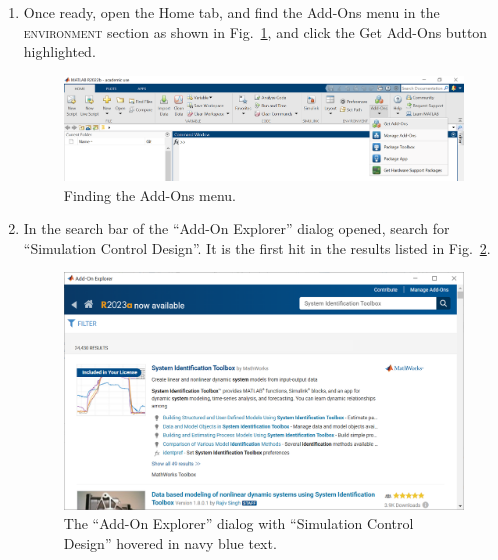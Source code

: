 \documentclass[12pt]{article}
\begin{document}
\begin{enumerate}
    \item
        Once ready,
        open the Home tab,
        and find the Add-Ons menu in the \textsc{environment} section
        as shown in Fig.~\ref{fig:finding addons},
        and click the Get Add-Ons button highlighted.

        \begin{figure}
            \centering
            \includegraphics[width=\linewidth]{img/intro_010_finding_addons.png}
            \caption{Finding the Add-Ons menu.}
            \label{fig:finding addons}
        \end{figure}

    \item
        In the search bar of the ``Add-On Explorer'' dialog opened,
        search for ``Simulation Control Design''.
        It is the first hit in the results listed in Fig.~\ref{fig:searching System Identification Toolbox}.

        \begin{figure}
            \centering
            \includegraphics[width=\linewidth]{img/intro_020_searching_system_id_toolbox.png}
            \caption{The ``Add-On Explorer'' dialog with ``Simulation Control Design'' hovered in navy blue text.}
            \label{fig:searching System Identification Toolbox}
        \end{figure}


\end{enumerate}
\end{document}
